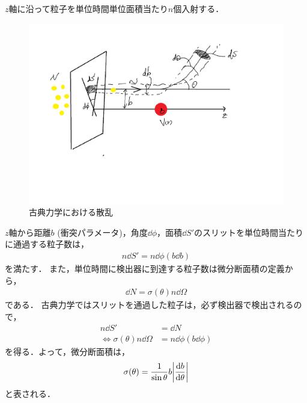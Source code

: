 \documentclass{report}
\begin{document}
  $z$軸に沿って粒子を単位時間単位面積当たり$n$個入射する．
  \begin{figure}[H]
    \centering
    \includegraphics[width=0.7\columnwidth]{fig/scattering_cm.pdf}
    \caption{古典力学における散乱}
    \label{sc-in-cm-image}
  \end{figure}
  $z$軸から距離$b$ (衝突パラメータ)，角度$\dd{\phi}$，面積$\dd{S'}$のスリットを単位時間当たりに通過する粒子数は，
  \begin{align}
    n\dd{S'} = n \dd{\phi} (b \dd{b})
  \end{align}
  を満たす．
  また，単位時間に検出器に到達する粒子数は微分断面積の定義から，
  \begin{align}
    \dd{N} = \sigma(\theta) n \dd{\Omega}
  \end{align}
  である．
  古典力学ではスリットを通過した粒子は，必ず検出器で検出されるので，
  \begin{align}
    n\dd{S'} &= \dd{N} \\ 
    \Leftrightarrow \sigma (\theta) n \dd{\Omega} &= n \dd{\phi} (b \dd{\phi})
  \end{align}
  を得る．よって，微分断面積は，
  \begin{align}
    \sigma(\theta) = \frac{1}{\sin \theta} b \abs{\frac{\dd{b}}{\dd{\theta}}}
  \end{align}
  と表される．
\end{document}
